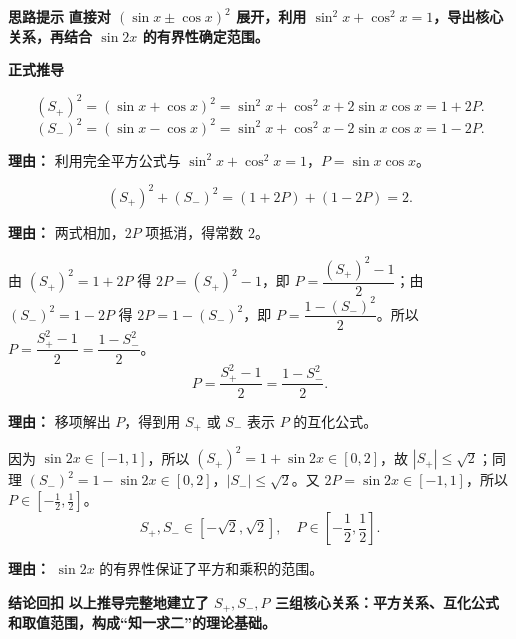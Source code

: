 \begin{proofbox}
	\textbf{\textcolor{CProof}{思路提示}}
	\textbf{直接对 $(\sin x\pm\cos x)^2$ 展开，利用 $\sin^2x+\cos^2x=1$，导出核心关系，再结合 $\sin2x$ 的有界性确定范围。}

	\medskip
	\textbf{\textcolor{CProof}{正式推导}}
	\begin{description}[style=nextline, leftmargin=2.8em, labelsep=0.5em, itemsep=0.55em]
		\item[\textbf{步骤一（展开平方）：}]
			\[
				(S_+)^2 = (\sin x+\cos x)^2 = \sin^2 x+\cos^2 x+2\sin x\cos x = 1+2P.
			\]
			\[
				(S_-)^2 = (\sin x-\cos x)^2 = \sin^2 x+\cos^2 x-2\sin x\cos x = 1-2P.
			\]
			\par\textbf{理由：} 利用完全平方公式与 $\sin^2x+\cos^2x=1$，$P=\sin x\cos x$。
		\item[\textbf{步骤二（求平方和）：}]
			\[
				(S_+)^2+(S_-)^2 = (1+2P)+(1-2P)=2.
			\]
			\par\textbf{理由：} 两式相加，$2P$ 项抵消，得常数 $2$。
		\item[\textbf{步骤三（互化变形）：}]
			由 $(S_+)^2 = 1+2P$ 得 $2P = (S_+)^2-1$，即 $P=\dfrac{(S_+)^2-1}{2}$；由 $(S_-)^2=1-2P$ 得 $2P=1-(S_-)^2$，即 $P=\dfrac{1-(S_-)^2}{2}$。所以 $P=\dfrac{S_+^2-1}{2}=\dfrac{1-S_-^2}{2}$。
			\[
				P=\frac{S_+^2-1}{2}=\frac{1-S_-^2}{2}.
			\]
			\par\textbf{理由：} 移项解出 $P$，得到用 $S_+$ 或 $S_-$ 表示 $P$ 的互化公式。
		\item[\textbf{步骤四（范围推导）：}]
			因为 $\sin2x\in[-1,1]$，所以 $(S_+)^2=1+\sin2x\in[0,2]$，故 $|S_+|\le\sqrt2$；同理 $(S_-)^2=1-\sin2x\in[0,2]$，$|S_-|\le\sqrt2$。又 $2P=\sin2x\in[-1,1]$，所以 $P\in[-\frac12,\frac12]$。
			\[
				S_+,S_-\in[-\sqrt2,\sqrt2],\quad P\in\left[-\frac12,\frac12\right].
			\]
			\par\textbf{理由：} $\sin2x$ 的有界性保证了平方和乘积的范围。
	\end{description}

	\medskip
	\textbf{\textcolor{CProof}{结论回扣}}
	\textbf{以上推导完整地建立了 $S_+,S_-,P$ 三组核心关系：平方关系、互化公式和取值范围，构成“知一求二”的理论基础。}
\end{proofbox}
